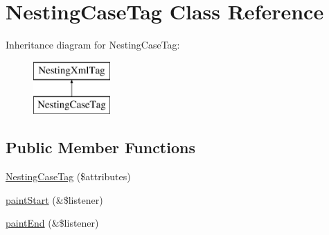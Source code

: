 \hypertarget{class_nesting_case_tag}{
\section{NestingCaseTag Class Reference}
\label{class_nesting_case_tag}
}
Inheritance diagram for NestingCaseTag:\begin{figure}[H]
\begin{center}
\leavevmode
\includegraphics[height=2.000000cm]{class_nesting_case_tag}
\end{center}
\end{figure}
\subsection*{Public Member Functions}
\begin{DoxyCompactItemize}
\item 
\hyperlink{class_nesting_case_tag_a4e43ead868e70800531012f34e7b0f06}{NestingCaseTag} (\$attributes)
\item 
\hyperlink{class_nesting_case_tag_a4c7de3322b2b23964f43306fe4fbd52d}{paintStart} (\&\$listener)
\item 
\hyperlink{class_nesting_case_tag_af3517ffbfd868a92d4df6b0433f5a456}{paintEnd} (\&\$listener)
\end{DoxyCompactItemize}


